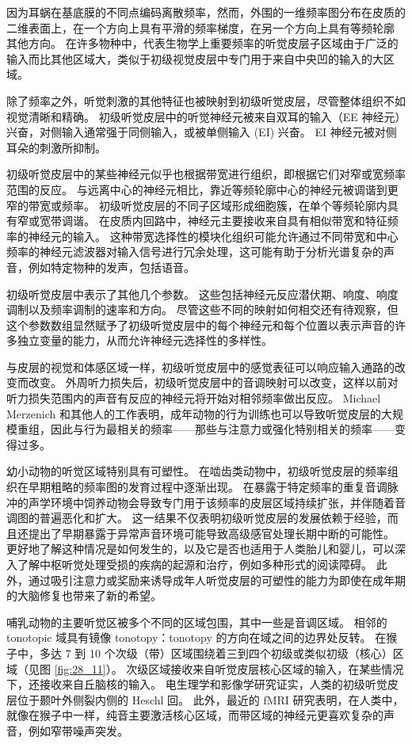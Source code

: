 因为耳蜗在基底膜的不同点编码离散频率，然而，外围的一维频率图分布在皮质的二维表面上，在一个方向上具有平滑的频率梯度，在另一个方向上具有等频轮廓 其他方向。 
在许多物种中，代表生物学上重要频率的听觉皮层子区域由于广泛的输入而比其他区域大，类似于初级视觉皮层中专门用于来自中央凹的输入的大区域。


除了频率之外，听觉刺激的其他特征也被映射到初级听觉皮层，尽管整体组织不如视觉清晰和精确。 
初级听觉皮层中的听觉神经元被来自双耳的输入（EE 神经元）兴奋，对侧输入通常强于同侧输入，或被单侧输入 (EI) 兴奋。 
EI 神经元被对侧耳朵的刺激所抑制。


初级听觉皮层中的某些神经元似乎也根据带宽进行组织，即根据它们对窄或宽频率范围的反应。 
与远离中心的神经元相比，靠近等频轮廓中心的神经元被调谐到更窄的带宽或频率。 
初级听觉皮层的不同子区域形成细胞簇，在单个等频轮廓内具有窄或宽带调谐。 
在皮质内回路中，神经元主要接收来自具有相似带宽和特征频率的神经元的输入。 
这种带宽选择性的模块化组织可能允许通过不同带宽和中心频率的神经元滤波器对输入信号进行冗余处理，这可能有助于分析光谱复杂的声音，例如特定物种的发声，包括语音。


初级听觉皮层中表示了其他几个参数。 
这些包括神经元反应潜伏期、响度、响度调制以及频率调制的速率和方向。 
尽管这些不同的映射如何相交还有待观察，但这个参数数组显然赋予了初级听觉皮层中的每个神经元和每个位置以表示声音的许多独立变量的能力，从而允许神经元选择性的多样性。


与皮层的视觉和体感区域一样，初级听觉皮层中的感觉表征可以响应输入通路的改变而改变。 
外周听力损失后，初级听觉皮层中的音调映射可以改变，这样以前对听力损失范围内的声音有反应的神经元将开始对相邻频率做出反应。 
Michael Merzenich 和其他人的工作表明，成年动物的行为训练也可以导致听觉皮层的大规模重组，因此与行为最相关的频率——那些与注意力或强化特别相关的频率——变得过多。


幼小动物的听觉区域特别具有可塑性。 
在啮齿类动物中，初级听觉皮层的频率组织在早期粗略的频率图的发育过程中逐渐出现。
在暴露于特定频率的重复音调脉冲的声学环境中饲养动物会导致专门用于该频率的皮层区域持续扩张，并伴随着音调图的普遍恶化和扩大。
这一结果不仅表明初级听觉皮层的发展依赖于经验，而且还提出了早期暴露于异常声音环境可能导致高级感官处理长期中断的可能性。 
更好地了解这种情况是如何发生的，以及它是否也适用于人类胎儿和婴儿，可以深入了解中枢听觉处理受损的疾病的起源和治疗，例如多种形式的阅读障碍。 
此外，通过吸引注意力或奖励来诱导成年人听觉皮层的可塑性的能力为即使在成年期的大脑修复也带来了新的希望。

哺乳动物的主要听觉区被多个不同的区域包围，其中一些是音调区域。 
相邻的 tonotopic 域具有镜像 tonotopy：tonotopy 的方向在域之间的边界处反转。 
在猴子中，多达 7 到 10 个次级（带）区域围绕着三到四个初级或类似初级（核心）区域（见图 \ref{fig:28_11}）。 
次级区域接收来自听觉皮层核心区域的输入，在某些情况下，还接收来自丘脑核的输入。 
电生理学和影像学研究证实，人类的初级听觉皮层位于颞叶外侧裂内侧的 Heschl 回。 
此外，最近的 fMRI 研究表明，在人类中，就像在猴子中一样，纯音主要激活核心区域，而带区域的神经元更喜欢复杂的声音，例如窄带噪声突发。



